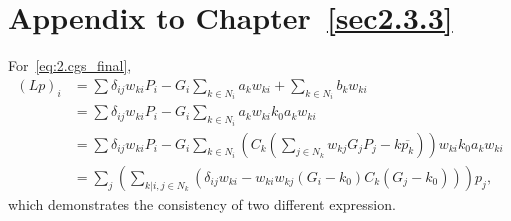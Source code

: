 \section{Appendix to Chapter~\ref{sec2.3.3}}
\label{ap2}
For~\eqref{eq:2.cgs_final},
\begin{equation}
\begin{split}
(Lp)_{i} &= \sum{\delta_{ij}w_{ki}P_{i}}-G_{i}\sum_{k\in N_{i}}{a_{k}w_{ki}}+\sum_{k\in N_{i}}{b_{k}w_{ki}}\\
&= \sum{\delta_{ij}w_{ki}P_{i}}-G_{i}\sum_{k\in N_{i}}{a_{k}w_{ki}k_{0}a_{k}w_{ki}}\\
&= \sum{\delta_{ij}w_{ki}P_{i}}-G_{i}\sum_{k\in N_{i}}{(C_{k}(\sum_{j\in N_{k}}{w_{kj}}G_{j}P_{j}-k\overline{p_{k}}))w_{ki}k_{0}a_{k}w_{ki}}\\
& = \sum_{j}{(\sum_{k|i,j\in N_{k}}{(\delta_{ij}w_{ki}-w_{ki}w_{kj}(G_{i}-k_{0})C_{k}(G_{j}-k_{0}))})p_j},
\end{split}
\end{equation}
which demonstrates the consistency of two different expression.
\let\thesection\oldthesection